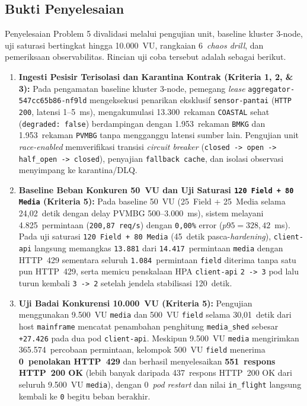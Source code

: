 \subsection{Bukti Penyelesaian}
Penyelesaian Problem 5 divalidasi melalui pengujian unit, baseline kluster 3-node, uji saturasi bertingkat hingga 10.000~VU, rangkaian 6~\textit{chaos drill}, dan pemeriksaan observabilitas. Rincian uji coba tersebut adalah sebagai berikut.
\begin{enumerate}
    \item \textbf{Ingesti Pesisir Terisolasi dan Karantina Kontrak (Kriteria 1, 2, \& 3):} Pada pengamatan baseline kluster 3-node, pemegang \textit{lease} \texttt{aggregator-547cc65b86-nf9ld} mengeksekusi penarikan eksklusif \texttt{sensor-pantai} (\texttt{HTTP 200}, latensi 1--5~ms), mengakumulasi 13.300~rekaman \texttt{COASTAL} sehat (\texttt{degraded: false}) berdampingan dengan 1.953~rekaman \texttt{BMKG} dan 1.953~rekaman \texttt{PVMBG} tanpa mengganggu latensi sumber lain. Pengujian unit \textit{race-enabled} memverifikasi transisi \textit{circuit breaker} (\texttt{closed -> open -> half\_open -> closed}), penyajian \texttt{fallback cache}, dan isolasi observasi menyimpang ke karantina/DLQ.
    \item \textbf{Baseline Beban Konkuren 50~VU dan Uji Saturasi \texttt{120 Field + 80 Media} (Kriteria 5):} Pada baseline 50~VU (25~Field + 25~Media selama 24,02~detik dengan delay PVMBG 500--3.000~ms), sistem melayani 4.825~permintaan (\texttt{200,87 req/s}) dengan \texttt{0,00\%} error ($p95 = 328,42$~ms). Pada uji saturasi \texttt{120 Field + 80 Media} (45~detik pasca-\textit{hardening}), \texttt{client-api} langsung memangkas \texttt{13.881} dari \texttt{14.417}~permintaan \texttt{media} dengan HTTP~429 sementara seluruh \texttt{1.084}~permintaan \texttt{field} diterima tanpa satu pun HTTP~429, serta memicu penskalaan HPA \texttt{client-api} \texttt{2 -> 3} pod lalu turun kembali \texttt{3 -> 2} setelah jendela stabilisasi 120~detik.
    \item \textbf{Uji Badai Konkurensi 10.000~VU (Kriteria 5):} Pengujian menggunakan 9.500~VU \texttt{media} dan 500~VU \texttt{field} selama 30,01~detik dari host \texttt{mainframe} mencatat penambahan penghitung \texttt{media\_shed} sebesar \texttt{+27.426} pada dua pod \texttt{client-api}. Meskipun 9.500~VU \texttt{media} mengirimkan 365.574~percobaan permintaan, kelompok 500~VU \texttt{field} menerima \textbf{0~penolakan HTTP~429} dan berhasil menyelesaikan \textbf{551~respons HTTP~200 OK} (lebih banyak daripada 437~respons HTTP~200 OK dari seluruh 9.500~VU \texttt{media}), dengan 0~\textit{pod restart} dan nilai \texttt{in\_flight} langsung kembali ke \texttt{0} begitu beban berakhir.

\end{enumerate}
